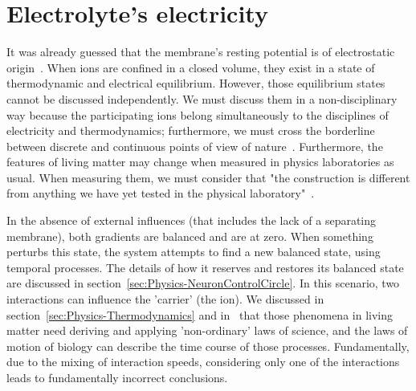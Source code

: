 

\section[Electrolyte's electricity]{Electrolyte's electricity\label{sec:Physics-MembraneElectricity}}

It was already guessed that the membrane's resting potential is of electrostatic origin~\cite{MembranePotentialAbsorption:2014,OriginMembranePotential:2018,Hodgkin-HuxleyAdsorption:2021,MembranePotentialPermeability:2024,MembranePotentialKeyFunction:2023}.
When ions are confined in a closed volume,
they exist in a state of thermodynamic and electrical equilibrium.
However, those equilibrium states cannot be discussed independently.
We must discuss them in a non-disciplinary way because the participating ions belong simultaneously to the disciplines of electricity and thermodynamics; furthermore, we must cross the borderline between discrete and continuous points of view 
of nature~\cite{VeghNon-ordinaryLaws:2025}.
Furthermore, the features of living matter may change when measured 
in physics laboratories as usual.
When measuring them, we must consider that "the construction is different from anything we have yet tested in the physical laboratory"~\cite{Schrodinger:1992}.

In the absence of external influences (that includes the lack of a separating membrane),
both gradients are balanced and are at zero.
When something perturbs this state, the system attempts to find a 
new balanced state, using temporal processes.
The details of how it reserves and restores its balanced state
are discussed in section~\ref{sec:Physics-NeuronControlCircle}.
In this scenario, two interactions can influence the 'carrier' (the ion).
We discussed in section~\ref{sec:Physics-Thermodynamics} and in~\cite{VeghNon-ordinaryLaws:2025} that those phenomena in living matter 
need deriving and applying 'non-ordinary' laws of science, and the laws of motion of biology can describe the time course of those processes.
Fundamentally, due to the mixing of interaction speeds, considering only one of the interactions leads to fundamentally incorrect conclusions.

